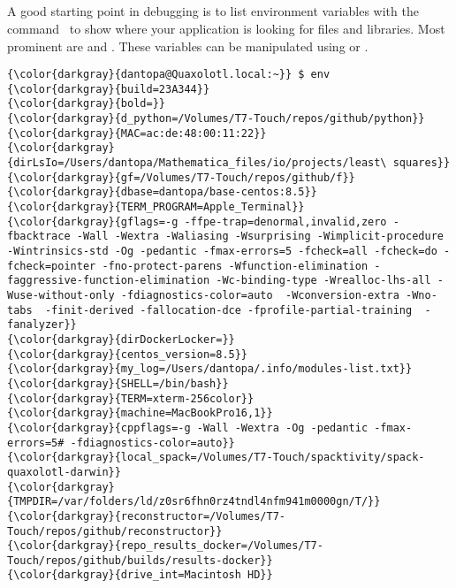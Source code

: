 % 

\subsection{\env}
\label{sec:env}
A good starting point in debugging is to list environment variables with the command  \ to show where your application is looking for files and libraries. Most prominent are \href{https://en.wikipedia.org/wiki/Rpath}{} and \href{https://unix.stackexchange.com/questions/46614/how-to-export-ld-library-path-to-all-users-and-system-services}{}. These variables can be manipulated using \href{https://linux.die.net/man/1/chrpath}{} or \href{https://github.com/NixOS/patchelf}{}.
{\footnotesize{
\begin{Verbatim}[commandchars=\\\{\}]
{\color{darkgray}{dantopa@Quaxolotl.local:~}} $ env
{\color{darkgray}{build=23A344}}
{\color{darkgray}{bold=}}
{\color{darkgray}{d_python=/Volumes/T7-Touch/repos/github/python}}
{\color{darkgray}{MAC=ac:de:48:00:11:22}}
{\color{darkgray}{dirLsIo=/Users/dantopa/Mathematica_files/io/projects/least\ squares}}
{\color{darkgray}{gf=/Volumes/T7-Touch/repos/github/f}}
{\color{darkgray}{dbase=dantopa/base-centos:8.5}}
{\color{darkgray}{TERM_PROGRAM=Apple_Terminal}}
{\color{darkgray}{gflags=-g -ffpe-trap=denormal,invalid,zero -fbacktrace -Wall -Wextra -Waliasing -Wsurprising -Wimplicit-procedure -Wintrinsics-std -Og -pedantic -fmax-errors=5 -fcheck=all -fcheck=do -fcheck=pointer -fno-protect-parens -Wfunction-elimination -faggressive-function-elimination -Wc-binding-type -Wrealloc-lhs-all -Wuse-without-only -fdiagnostics-color=auto  -Wconversion-extra -Wno-tabs  -finit-derived -fallocation-dce -fprofile-partial-training  -fanalyzer}}
{\color{darkgray}{dirDockerLocker=}}
{\color{darkgray}{centos_version=8.5}}
{\color{darkgray}{my_log=/Users/dantopa/.info/modules-list.txt}}
{\color{darkgray}{SHELL=/bin/bash}}
{\color{darkgray}{TERM=xterm-256color}}
{\color{darkgray}{machine=MacBookPro16,1}}
{\color{darkgray}{cppflags=-g -Wall -Wextra -Og -pedantic -fmax-errors=5# -fdiagnostics-color=auto}}
{\color{darkgray}{local_spack=/Volumes/T7-Touch/spacktivity/spack-quaxolotl-darwin}}
{\color{darkgray}{TMPDIR=/var/folders/ld/z0sr6fhn0rz4tndl4nfm941m0000gn/T/}}
{\color{darkgray}{reconstructor=/Volumes/T7-Touch/repos/github/reconstructor}}
{\color{darkgray}{repo_results_docker=/Volumes/T7-Touch/repos/github/builds/results-docker}}
{\color{darkgray}{drive_int=Macintosh HD}}

\end{Verbatim}}}
